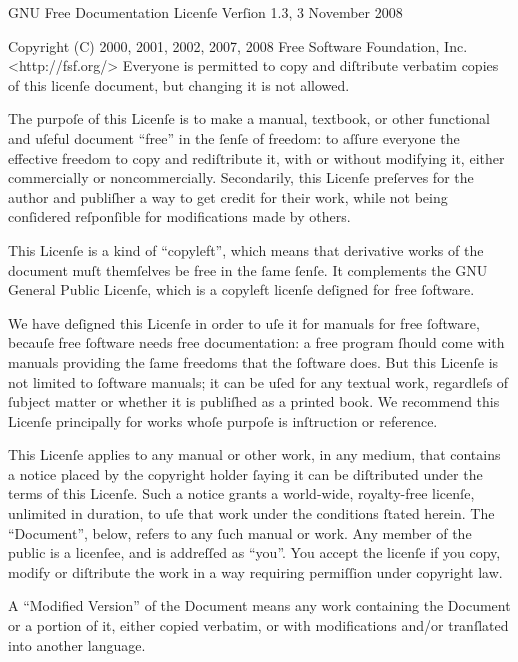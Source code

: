 \hypertarget{fdl}{}

                GNU Free Documentation Licenſe
                 Verſion 1.3, 3 November 2008

 Copyright (C) 2000, 2001, 2002, 2007, 2008 Free Software Foundation, Inc.
     <http://fsf.org/>
 Everyone is permitted to copy and diſtribute verbatim copies
 of this licenſe document, but changing it is not allowed.


The purpoſe of this Licenſe is to make a manual, textbook, or other
functional and uſeful document “free” in the ſenſe of freedom: to
aſſure everyone the effective freedom to copy and rediſtribute it,
with or without modifying it, either commercially or noncommercially.
Secondarily, this Licenſe preſerves for the author and publiſher a way
to get credit for their work, while not being conſidered reſponſible
for modifications made by others.

This Licenſe is a kind of “copyleft”, which means that derivative
works of the document muſt themſelves be free in the ſame ſenſe. It
complements the GNU General Public Licenſe, which is a copyleft
licenſe deſigned for free ſoftware.

We have deſigned this Licenſe in order to uſe it for manuals for free
ſoftware, becauſe free ſoftware needs free documentation: a free
program ſhould come with manuals providing the ſame freedoms that the
ſoftware does. But this Licenſe is not limited to ſoftware manuals;
it can be uſed for any textual work, regardleſs of ſubject matter or
whether it is publiſhed as a printed book. We recommend this Licenſe
principally for works whoſe purpoſe is inſtruction or reference.


This Licenſe applies to any manual or other work, in any medium, that
contains a notice placed by the copyright holder ſaying it can be
diſtributed under the terms of this Licenſe. Such a notice grants a
world-wide, royalty-free licenſe, unlimited in duration, to uſe that
work under the conditions ſtated herein. The “Document”, below,
refers to any ſuch manual or work. Any member of the public is a
licenſee, and is addreſſed as “you”. You accept the licenſe if you
copy, modify or diſtribute the work in a way requiring permiſſion
under copyright law.

A “Modified Version” of the Document means any work containing the
Document or a portion of it, either copied verbatim, or with
modifications and/or tranſlated into another language.

